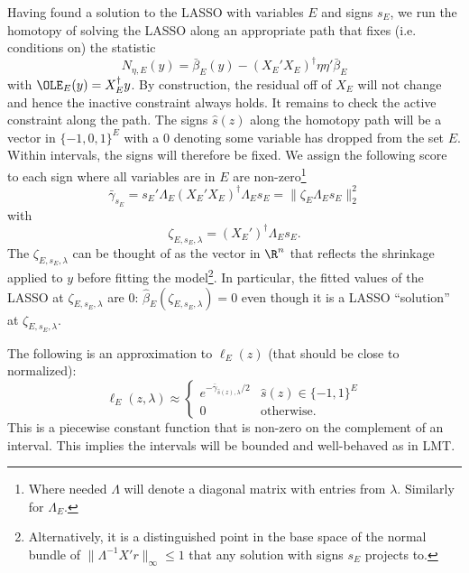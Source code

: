 \documentclass{article}
\newcommand{\OLS}{\bar{\beta}}
\newcommand{\REG}{\hat{\beta}}
\begin{document}
        Having found a solution to the LASSO with variables $E$ and signs $s_E$, we run the
        homotopy of solving the LASSO along an appropriate  path that fixes (i.e. conditions on)
        the statistic
        $$
        N_{\eta,E}(y) = \OLS_E(y) - (X_E'X_E)^{\dagger} \eta \eta'\OLS_E
        $$
        with $\OLE_E(y) = X_E^{\dagger}y$.
 By construction, the residual off of $X_E$ will not change
        and hence the inactive constraint always holds. It remains to
        check the active constraint along the path.  The signs $\hat{s}(z)$ along
        the homotopy path will be a vector in $\{-1,0,1\}^E$ with a 0
        denoting some variable has dropped from the set $E$. Within
        intervals, the signs will therefore be fixed. We assign the
        following score to each sign where all variables are in $E$
        are non-zero\footnote{Where needed $\Lambda$ will denote a
          diagonal matrix with entries from $\lambda$. Similarly for
          $\Lambda_E$. 
        }
        $$
        \bar{\gamma}_{s_E} = s_E'\Lambda_E(X_E'X_E)^{\dagger}\Lambda_Es_E = \|\zeta_E\Lambda_Es_E\|^2_2
        $$
        with
        \begin{equation}
          \label{eq:sign:offsets}
        \zeta_{E,s_E,\lambda} = (X_E')^{\dagger}\Lambda_Es_E.
        \end{equation}
The
          $\zeta_{E,s_E,\lambda}$ can be thought of as the vector in $\R^n$
          that reflects the shrinkage applied to $y$ before fitting
          the model\footnote{Alternatively, it is a distinguished point 
          in the base space of the normal bundle of $\|\Lambda^{-1}X'r\|_{\infty} \leq 1$ that any solution with signs $s_E$ projects to.}. In particular, the fitted values of the LASSO at
          $\zeta_{E,s_E,\lambda}$ are 0: $\REG_E(\zeta_{E,s_E,\lambda})=0$ even though
          it is a LASSO ``solution'' at $\zeta_{E,s_E,\lambda}$.

        The following is an approximation to $\ell_E(z)$ (that should be close to normalized):
        \begin{equation}
          \label{eq:selective:RN}
        \ell_E(z,\lambda) \approx \begin{cases}
          e^{-\bar{\gamma}_{\hat{s}(z),\lambda}/2} & \hat{s}(z) \in \{-1,1\}^E \\
          0 & \text{otherwise.}
          \end{cases}
        \end{equation}
        This is a piecewise constant function that  is
        non-zero on the complement of an interval. This implies the intervals will be
        bounded and well-behaved as in LMT.
        
\end{document}
